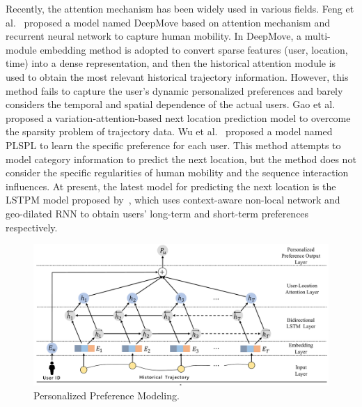 \documentclass[10pt,journal,compsoc]{IEEEtran}
\begin{document}
Recently, the attention mechanism has been widely used in various fields. Feng et al.~\cite{feng2018deepmove} proposed a model named DeepMove based on attention mechanism and recurrent neural network to capture human mobility. In DeepMove, a multi-module embedding method is adopted to convert sparse features (user, location, time) into a dense representation, and then the historical attention module is used to obtain the most relevant historical trajectory information. However, this method fails to capture the user's dynamic personalized preferences and barely considers the temporal and spatial dependence of the actual users. Gao et al.~\cite{gao2019predicting} proposed a variation-attention-based next location prediction model to overcome the sparsity problem of trajectory data. Wu et al.~\cite{wu2020personalized} proposed a model named PLSPL to learn the specific preference for each user. This method attempts to model category information to predict the next location, but the method does not consider the specific regularities of human mobility and the sequence interaction influences. At present, the latest model for predicting the next location is the LSTPM model proposed by~\cite{sun2020go}, which uses context-aware non-local network and geo-dilated RNN to obtain users' long-term and short-term preferences respectively.

\begin{figure}[htpb]
    \centering
    \includegraphics[width=14cm]{figure/BiLSTM.pdf}
    \caption{Personalized Preference Modeling.}
    \label{fig.3}
\end{figure}
\end{document}
